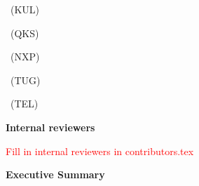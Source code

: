 \ifdefined\authorlistKUL
    \colonlist\authorlistKUL
    ~(KUL)
\else
\fi

\ifdefined\authorlistQKS
    \colonlist\authorlistQKS
    ~(QKS)
\else
\fi

\ifdefined\authorlistNXP
    \colonlist\authorlistNXP
    ~(NXP)
\else
\fi

\ifdefined\authorlistTUG
    \colonlist\authorlistTUG
    ~(TUG)
\else
\fi

\ifdefined\authorlistTEL
    \colonlist\authorlistTEL
    ~(TEL)
\else
\fi

\vspace*{1cm}

\textbf{Internal reviewers}\\
\vspace*{0.1cm}

\newcommand{\printnewline}[1]{#1\par}

\ifdefined\authorlistReviewers
    \forlistloop{\printnewline}{\authorlistReviewers}
\else
    \textcolor{red}{Fill in internal reviewers in contributors.tex}
\fi



\clearpage
\textbf{\Large{Executive Summary}}\\
\vspace*{0.3cm}



\pagebreak

{%
\hypersetup{linkcolor=black}
\tableofcontents
}

{\small \printnoidxglossaries}
\pagebreak


